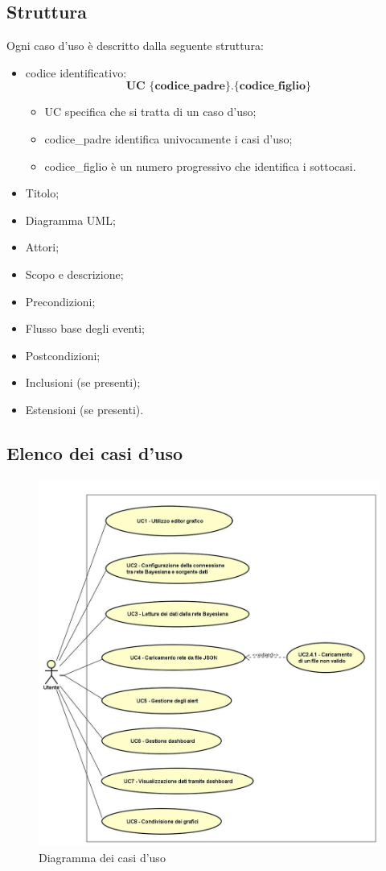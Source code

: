 \subsection{Struttura}
Ogni caso d'uso è descritto dalla seguente struttura:
\begin{itemize}
	\item codice identificativo: $$ \textbf{UC \{codice\_padre\}.\{codice\_figlio\}  } $$
	\begin{itemize}
		\item UC specifica che si tratta di un caso d'uso;
		\item codice\_padre identifica univocamente i casi d'uso;
		\item codice\_figlio è un numero progressivo che identifica i sottocasi.
	\end{itemize}
	\item Titolo;
	\item Diagramma UML;
	\item Attori;
	\item Scopo e descrizione;
	\item Precondizioni;
	\item Flusso base degli eventi;
	\item Postcondizioni;
	\item Inclusioni (se presenti);
	\item Estensioni (se presenti).
\end{itemize}

\newpage
\subsection{Elenco dei casi d'uso}
\begin{figure} [H]
	\centering
	\includegraphics[scale=0.5]{Img/UC}
	\caption{Diagramma dei casi d'uso}\label{}
\end{figure}
